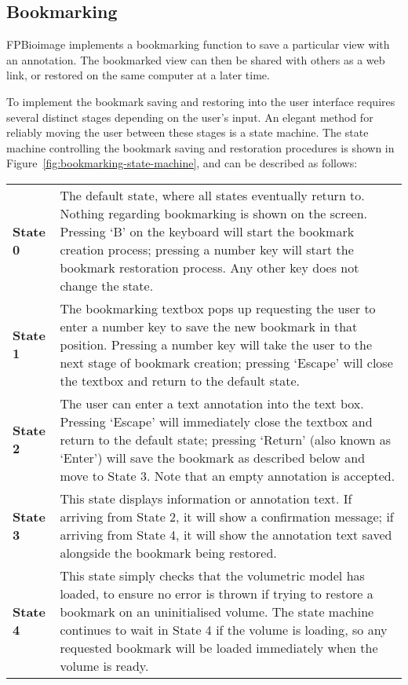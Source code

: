 \subsection{Bookmarking}
FPBioimage implements a bookmarking function to save a particular view with an annotation.
The bookmarked view can then be shared with others as a web link, or restored on the same computer at a later time.

To implement the bookmark saving and restoring into the user interface requires several distinct stages depending on the user's input.
An elegant method for reliably moving the user between these stages is a state machine.
The state machine controlling the bookmark saving and restoration procedures is shown in Figure~\ref{fig:bookmarking-state-machine}, and can be described as follows:
\begin{tabular}{>{\bfseries}l p{}}
State 0 & The default state, where all states eventually return to. Nothing regarding bookmarking is shown on the screen. Pressing `B' on the keyboard will start the bookmark creation process; pressing a number key will start the bookmark restoration process. Any other key does not change the state. \\
State 1 & The bookmarking textbox pops up requesting the user to enter a number key to save the new bookmark in that position. Pressing a number key will take the user to the next stage of bookmark creation; pressing `Escape' will close the textbox and return to the default state. \\
State 2 & The user can enter a text annotation into the text box. Pressing `Escape' will immediately close the textbox and return to the default state; pressing `Return' (also known as `Enter') will save the bookmark as described below and move to State 3. Note that an empty annotation is accepted. \\
State 3 & This state displays information or annotation text. If arriving from State 2, it will show a confirmation message; if arriving from State 4, it will show the annotation text saved alongside the bookmark being restored. \\
State 4 & This state simply checks that the volumetric model has loaded, to ensure no error is thrown if trying to restore a bookmark on an uninitialised volume. The state machine continues to wait in State 4 if the volume is loading, so any requested bookmark will be loaded immediately when the volume is ready. \\
\end{tabular}

